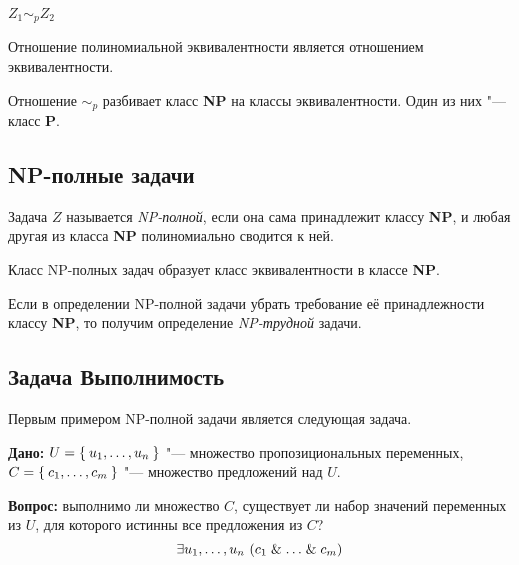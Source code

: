 \begin{notation}
	$ Z_1 \sim_p Z_2 $
\end{notation}

\begin{theorem}
	Отношение полиномиальной эквивалентности является отношением эквивалентности.
\end{theorem}

Отношение $ \sim_p $ разбивает класс \textbf{NP} на классы эквивалентности.
Один из них "--- класс \textbf{P}.

\subsection{NP-полные задачи}

\begin{definition}
	Задача $ Z $ называется \emph{NP-полной}, если она сама принадлежит классу \textbf{NP}, и любая другая из класса \textbf{NP} полиномиально сводится к ней.
\end{definition}

\begin{theorem}
	Класс NP-полных задач образует класс эквивалентности в классе \textbf{NP}.
\end{theorem}

Если в определении NP-полной задачи убрать требование её принадлежности классу \textbf{NP}, то получим определение \emph{NP-трудной} задачи.

\subsection{Задача Выполнимость}

Первым примером NP-полной задачи является следующая задача.

\begin{problem}[Выполнимость]
	\textbf{Дано:} $ U = \Set{u_1, \dots, u_n} $ "--- множество пропозициональных переменных, $ C = \Set{c_1, \dots, c_m} $ "--- множество предложений над $ U $.

	\textbf{Вопрос:} выполнимо ли множество $ C $, \ie существует ли набор значений переменных из $ U $, для которого истинны все предложения из $ C $?
	$$ \exists u_1, \dots, u_n~(c_1 \mathrel\& \dots \mathrel\& c_m) $$
\end{problem}
